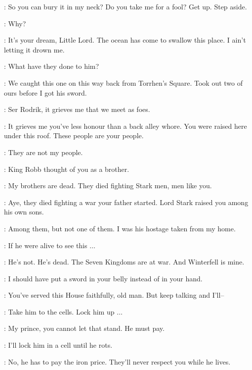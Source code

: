 \THEON: So you can bury it in my neck? Do you take me for a fool? Get up. Step aside. 


\BRAN:  Why? 

\OSHA:  It's your dream, Little Lord. The ocean has come to swallow this place. I ain't letting it drown me. 


\BRAN: What have they done to him? 

\LORREN: We caught this one on this way back from Torrhen's Square. Took out two of ours before I got his sword. 

\THEON: Ser Rodrik, it grieves me that we meet as foes. 

\RODRIK: It grieves me you've less honour than a back alley whore. You were raised here under this roof. These people are your people. 

\THEON: They are not my people. 

\RODRIK: King Robb thought of you as a brother. 

\THEON: My brothers are dead. They died fighting Stark men, men like you. 

\RODRIK: Aye, they died fighting a war your father started. Lord Stark raised you among his own sons. 

\THEON: Among them, but not one of them. I was his hostage taken from my home. 

\RODRIK: If he were alive to see this $\ldots$ 

\THEON: He's not. He's dead. The Seven Kingdoms are at war. And Winterfell is mine. 

\RODRIK: I should have put a sword in your belly instead of in your hand. 

\THEON: You've served this House faithfully, old man. But keep talking and I'll-- 


\THEON: Take him to the cells. Lock him up $\ldots$ 

\DAGMER: My prince, you cannot let that stand. He must pay. 

\THEON: I'll lock him in a cell until he rots. 

\DAGMER: No, he has to pay the iron price. They'll never respect you while he lives. 

